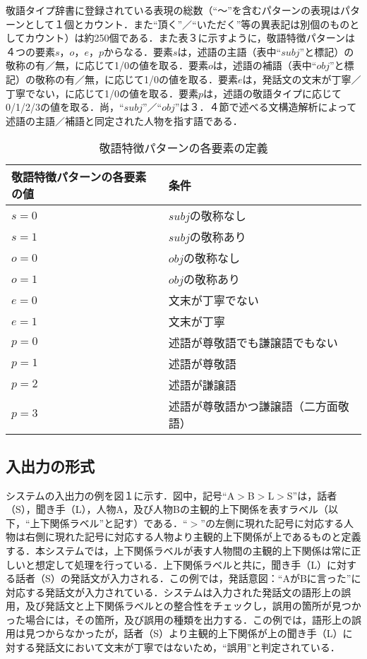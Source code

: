 敬語タイプ辞書に登録されている表現の総数（``〜''を含むパターンの表現はパターンとして１個とカウント．また``頂く''／``いただく''等の異表記は別個のものとしてカウント）は約250個である．また表３に示すように，敬語特徴パターンは４つの要素$s$，$o$，$e$，$p$からなる．要素$s$は，述語の主語（表中``$subj$''と標記）の敬称の有／無，に応じて1/0の値を取る．要素$o$は，述語の補語（表中``$obj$''と標記）の敬称の有／無，に応じて1/0の値を取る．要素$e$は，発話文の文末が丁寧／丁寧でない，に応じて1/0の値を取る．要素$p$は，述語の敬語タイプに応じて0/1/2/3の値を取る．尚，``$subj$''／``$obj$''は３．４節で述べる文構造解析によって述語の主語／補語と同定された人物を指す語である．

\begin{table}[htbp]
\begin{center} 
\caption{敬語特徴パターンの各要素の定義} 
\label{tbl:table3} 
\begin{tabular}{ll} 
\hline 
敬語特徴パターンの各要素の値&条件\\ 
\hline
$s=0$&$subj$の敬称なし\\
$s=1$&$subj$の敬称あり\\
\hline 
$o=0$&$obj$の敬称なし\\
$o=1$&$obj$の敬称あり\\
\hline 
$e=0$&文末が丁寧でない\\
$e=1$&文末が丁寧\\
\hline 
$p=0$&述語が尊敬語でも謙譲語でもない\\
$p=1$&述語が尊敬語\\
$p=2$&述語が謙譲語\\
$p=3$&述語が尊敬語かつ謙譲語（二方面敬語）\\
\hline 
\end{tabular} 
\end{center} 
\end{table} 

\subsection{入出力の形式}
システムの入出力の例を図１に示す．図中，記号``A$>$B$>$L$>$S''は，話者（S），聞き手（L），人物A，及び人物Bの主観的上下関係を表すラベル（以下，``上下関係ラベル''と記す）である．``$>$''の左側に現れた記号に対応する人物は右側に現れた記号に対応する人物より主観的上下関係が上であるものと定義する．本システムでは，上下関係ラベルが表す人物間の主観的上下関係は常に正しいと想定して処理を行っている．上下関係ラベルと共に，聞き手（L）に対する話者（S）の発話文が入力される．この例では，発話意図：``AがBに言った''に対応する発話文が入力されている．システムは入力された発話文の語形上の誤用，及び発話文と上下関係ラベルとの整合性をチェックし，誤用の箇所が見つかった場合には，その箇所，及び誤用の種類を出力する．この例では，語形上の誤用は見つからなかったが，話者（S）より主観的上下関係が上の聞き手（L）に対する発話文において文末が丁寧ではないため，``誤用''と判定されている．

